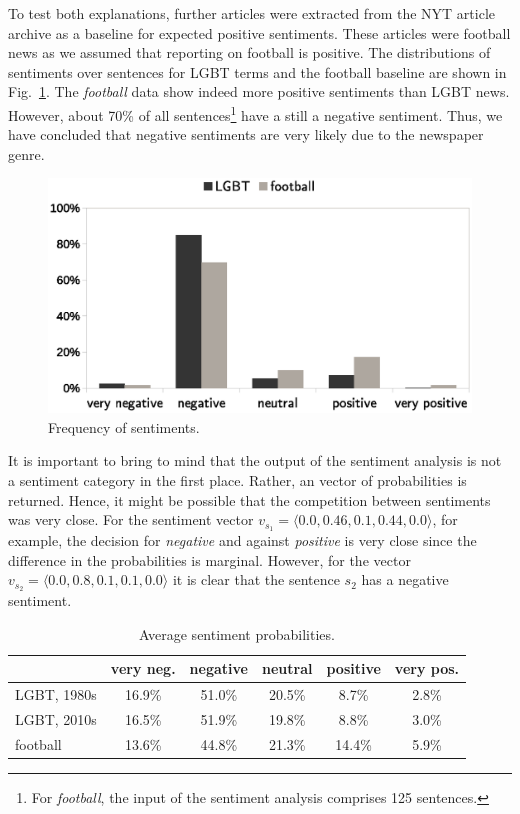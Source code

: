 \documentclass[10pt,a4paper,twocolumn]{scrartcl}
\begin{document}
To test both explanations, further articles were extracted from the NYT article archive as a baseline for expected positive sentiments. These articles were football news as we assumed that reporting on football is positive. The distributions of sentiments over sentences for LGBT terms and the football baseline are shown in Fig.~\ref{fig:sentiment1}. The \textit{football} data show indeed more positive sentiments than LGBT news. However, about 70\% of all sentences\footnote{For \textit{football}, the input of the sentiment analysis comprises 125 sentences.} have a still a negative sentiment. Thus, we have concluded that negative sentiments are very likely due to the newspaper genre.

\begin{figure}
\includegraphics[width=\columnwidth]{figures/sentiment1}
\caption{Frequency of sentiments.}\label{fig:sentiment1}
\end{figure} 


It is important to bring to mind that the output of the sentiment analysis is not a sentiment category in the first place. Rather, an vector of probabilities is returned.  Hence, it might be possible that the competition between sentiments was very close. For the sentiment vector $v_{s_1} = \langle 0.0, 0.46, 0.1, 0.44, 0.0\rangle$, for example, the decision for \textit{negative} and against \textit{positive} is very close since the difference in the probabilities is marginal. However, for the vector $v_{s_2} = \langle 0.0, 0.8, 0.1, 0.1, 0.0\rangle$ it is clear that the sentence $s_2$ has a negative sentiment.


\begin{table}
\centering
\caption{Average sentiment probabilities.} \label{tab:prob}
\begin{tabular}{lccccc}
\toprule
 & very neg. & negative & neutral & positive & very pos.\\
\midrule
LGBT, 1980s & 16.9\% & 51.0\% & 20.5\% & 8.7\% & 2.8\%\\
LGBT, 2010s & 16.5\% & 51.9\% & 19.8\% & 8.8\% & 3.0\%\\
football &  13.6\% & 44.8\% & 21.3\% & 14.4\% & 5.9\%\\
\bottomrule
\end{tabular}
\end{table}
\end{document}
